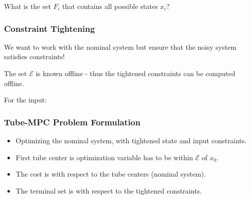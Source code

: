 \documentclass[8pt,a4paper]{scrartcl}
\begin{document}
\begin{multicols*}{3}
What is the set $F_i$ that contains all possible states $x_i$?



\subsubsection{Constraint Tightening}

We want to work with the nominal system but ensure that the noisy system satisfies constraints!


The set $\mathcal{E}$ is known offline - thus the tightened constraints can be computed offline.

\finn

For the input:


\subsubsection{Tube-MPC Problem Formulation}


\begin{itemize}
\ncompaq
\item Optimizing the nominal system, with tightened state and input constraints.
\item First tube center is optimization variable \dahe has to be within $\mathcal{E}$ of $x_0$.
\item The cost is with respect to the tube centers (nominal system).
\item The terminal set is with respect to the tightened constraints.
\end{itemize}


\end{multicols*}
\end{document}
